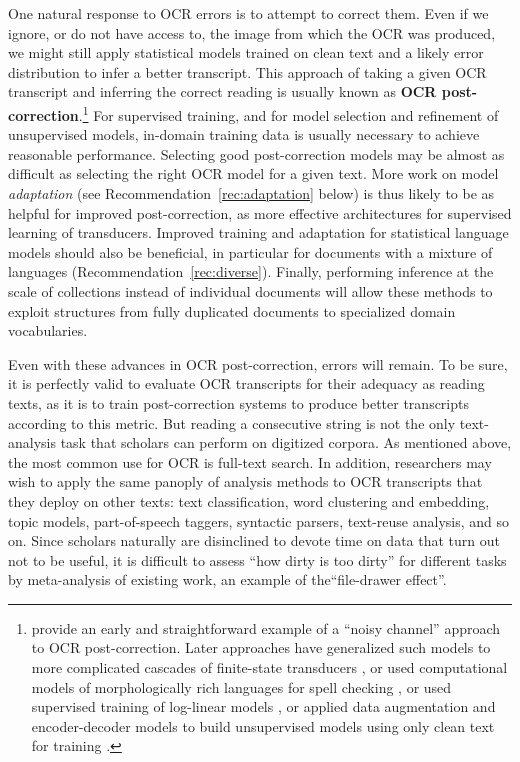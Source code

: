\documentclass[twoside,11pt]{report}
\begin{document}
One natural response to OCR errors is to attempt to correct them. Even if we ignore, or do not have access to, the image from which the OCR was produced, we might still apply statistical models trained on clean text and a likely error distribution to infer a better transcript. This approach of taking a given OCR transcript and inferring the correct reading is usually known as \textbf{OCR post-correction}.\footnote{\cite{tong96:_statis_approac_autom_ocr_error_correc_contex} provide an early and straightforward example of a ``noisy channel'' approach to OCR post-correction. Later approaches have generalized such models to more complicated cascades of finite-state transducers \citep{kolak2003generative,xu17:_retriev_combin_repeat_passag_improv_ocr}, or used computational models of morphologically rich languages for spell checking \citep{boschetti09:_improv_ocr_accur_class_critic_edition}, or used supervised training of log-linear models \citep{lund2011progressive}, or applied data augmentation and encoder-decoder models to build unsupervised models using only clean text for training \citep{dong18:acl}.}  For supervised training, and for model selection and refinement of unsupervised models, in-domain training data is usually necessary to achieve reasonable performance. Selecting good post-correction models may be almost as difficult as selecting the right OCR model for a given text. More work on model \emph{adaptation} (see Recommendation~\ref{rec:adaptation} below) is thus likely to be as helpful for improved post-correction, as more effective architectures for supervised learning of transducers. Improved training and adaptation for statistical language models should also be beneficial, in particular for documents with a mixture of languages (Recommendation~\ref{rec:diverse}). Finally, performing inference at the scale of collections instead of individual documents will allow these methods to exploit structures from fully duplicated documents to specialized domain vocabularies.

Even with these advances in OCR post-correction, errors will remain. To be sure, it is perfectly valid to evaluate OCR transcripts for their adequacy as reading texts, as it is to train post-correction systems to produce better transcripts according to this metric. But reading a consecutive string is not the only text-analysis task that scholars can perform on digitized corpora. As mentioned above, the most common use for OCR is full-text search. In addition, researchers may wish to apply the same panoply of analysis methods to OCR transcripts that they deploy on other texts: text classification, word clustering and embedding, topic models, part-of-speech taggers, syntactic parsers, text-reuse analysis, and so on. Since scholars naturally are disinclined to devote time on data that turn out not to be useful, it is difficult to assess ``how dirty is too dirty'' for different tasks by meta-analysis of existing work, an example of the``file-drawer effect''.
\end{document}

